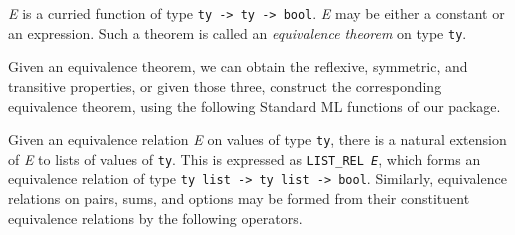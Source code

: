 \documentclass[envcountsame,runningheads]{llncs}
\begin{document}
\noindent
{\it E\/} is a curried function of type {\tt ty -> ty -> bool}. 
{\it E\/} may be either a constant or an expression.
Such a theorem is called an {\it equivalence theorem\/} on type {\tt ty}.

Given an equivalence theorem, we can obtain the reflexive, symmetric,
and transitive properties, or given those three, construct the corresponding
equivalence theorem, using the following Standard ML functions of our package.
\begin{center}
\end{center}

Given an equivalence relation {\it E\/} on values of type {\tt ty},
there is a natural extension of {\it E\/} to lists of values of {\tt ty}.
This is expressed as {\tt LIST\_REL {\it E\/}}, which forms an 
equivalence relation of type {\tt ty list -> ty list -> bool}.
Similarly, equivalence relations on pairs, sums, and options
may be formed
from their constituent equivalence relations by the following operators.

\begin{center}
\end{center}
\end{document}
